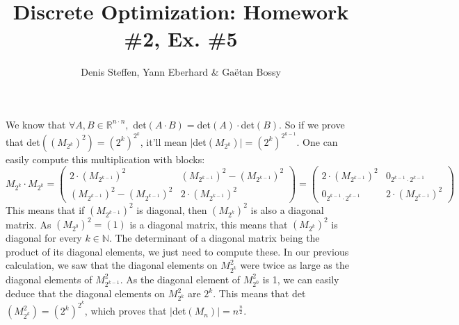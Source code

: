 \documentclass[a4paper,11pt,french]{article}
\title{Discrete Optimization: Homework \#2, Ex. \#5}
\author{Denis Steffen, Yann Eberhard \& Gaëtan Bossy}
\begin{document}
\maketitle
We know that $\forall A,B\in\mathbb{R}^{n\cdot n},\,\,$det$(A\cdot B)=$det$(A)\cdot $det$(B)$. So if we prove that det$((M_{2^k})^2)=(2^k)^{2^k}$, it'll mean $|$det$(M_{2^k})|=(2^k)^{2^{k-1}}$. One can easily compute this multiplication with blocks: 
\begin{equation*}
M_{2^k}\cdot M_{2^k}=
\begin{pmatrix}
    2\cdot(M_{2^{k-1}})^2 & (M_{2^{k-1}})^2-(M_{2^{k-1}})^2 \\ 
    (M_{2^{k-1}})^2-(M_{2^{k-1}})^2 &  2\cdot(M_{2^{k-1}})^2
  \end{pmatrix}=
  \begin{pmatrix}
    2\cdot(M_{2^{k-1}})^2 & 0_{2^{k-1}\cdot 2^{k-1}} \\ 
    0_{2^{k-1}\cdot 2^{k-1}} &  2\cdot(M_{2^{k-1}})^2
  \end{pmatrix}
 \end{equation*}
 This means that if $(M_{2^{k-1}})^2$ is diagonal, then $(M_{2^{k}})^2$ is also a diagonal matrix. 
 As $(M_{2^{0}})^2=(1)$ is a diagonal matrix, this means that $(M_{2^{k}})^2$ is diagonal for every $k\in\mathbb{N}$. 
 The determinant of a diagonal matrix being the product of its diagonal elements, we just need to compute these. 
 In our previous calculation, we saw that the diagonal elements on $M_{2^k}^2$ were twice as large as the diagonal elements of $M_{2^{k-1}}^2$. 
 As the diagonal element of $M_{2^0}^2$ is 1, we can easily deduce that the diagonal elements on $M_{2^k}^2$ are $2^k$. 
 This means that det$(M_{2^k}^2)=(2^k)^{2^k}$, which proves that $|$det$(M_n)|=n^{\frac{n}{2}}$.
  
\end{document}

